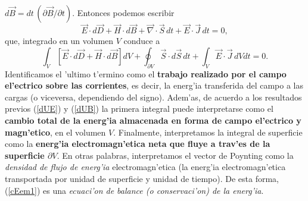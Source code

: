 $d\vec{B}=dt\,({\partial \vec{B}}/{\partial t})$. Entonces podemos escribir
\begin{equation}
\vec{E}\cdot
d\vec{D}+\vec{H}\cdot d\vec{B}+\vec\nabla\cdot\vec{S}\,dt+\vec{E}\cdot\vec{J}\,
dt=0,
\end{equation}
que, integrado en un volumen $V$ conduce a 
\begin{equation}
\boxed{\int_V\left[\vec{E}\cdot d\vec{D}+\vec{H}\cdot
d\vec{B}\right]dV+\oint_{\partial V}
\vec{S}\cdot d\vec{S}\,dt+\int_V\vec{E}\cdot\vec{J}\,
dVdt=0.} \label{cEem1}
\end{equation}
Identificamos el 'ultimo t'ermino como el \textbf{trabajo realizado por el campo el'ectrico sobre las corrientes}, es decir, la energ'ia transferida del campo a las cargas (o viceversa, dependiendo del signo). Adem'as, de acuerdo a los resultados previos (\ref{dUE}) y (\ref{dUB}) la primera integral puede interpretarse como el \textbf{cambio total de la energ'ia almacenada en forma de campo el'ectrico y magn'etico}, en el volumen $V$. Finalmente, interpretamos la integral de superficie como la \textbf{energ'ia electromagn'etica neta que fluye a trav'es de la superficie $\partial V$}. En otras palabras, interpretamos el vector de Poynting como la \textit{densidad de flujo de energ'ia} electromagn'etica (la energ'ia electromagn'etica transportada por unidad de superficie y unidad de tiempo). De esta forma, (\ref{cEem1}) es una \textit{ecuaci'on de balance (o conservaci'on) de la energ'ia}.

